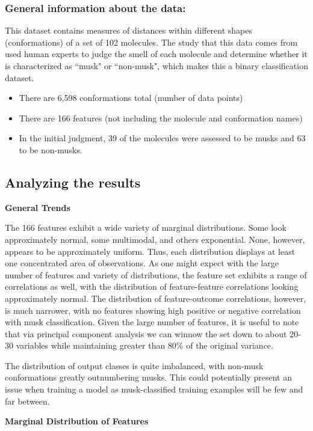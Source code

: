 \documentclass[12pt]{article}
\begin{document}
\subsubsection{General information about the data:}

This dataset contains measures of distances within different shapes (conformations) of a set of 102 molecules. The study that this data comes from used human experts to judge the smell of each molecule and determine whether it is characterized as ``musk" or ``non-musk", which makes this a binary classification dataset.
\begin{itemize}
\item There are 6,598 conformations total (number of data points)
\item There are 166 features (not including the molecule and conformation names)
\item In the initial judgment, 39 of the molecules were assessed to be musks and 63 to be non-musks.
\end{itemize}

\subsection{Analyzing the results}

\textbf{General Trends}

The 166 features exhibit a wide variety of marginal distributions. Some look approximately normal, some multimodal, and others exponential. None, however, appears to be approximately uniform. Thus, each distribution displays at least one concentrated area of observations. As one might expect with the large number of features and variety of distributions, the feature set exhibits a range of correlations as well, with the distribution of feature-feature correlations looking approximately normal. The distribution of feature-outcome correlations, however, is much narrower, with no features showing high positive or negative correlation with musk classification. Given the large number of features, it is useful to note that via principal component analysis we can winnow the set down to about 20-30 variables while maintaining greater than 80\% of the original variance.

The distribution of output classes is quite imbalanced, with non-musk conformations greatly outnumbering musks. This could potentially present an issue when training a model as musk-classified training examples will be few and far between.

\textbf{Marginal Distribution of Features}
\end{document}
